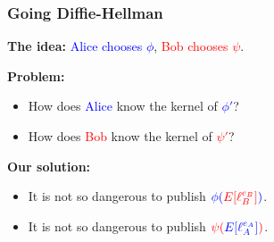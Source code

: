 \documentclass{beamer}
\newcommand{\bl}[1]{\textcolor{blue}{#1}}
\newcommand{\rd}[1]{\textcolor{red}{#1}}
\begin{document}

\begin{frame}
  \frametitle{Going Diffie-Hellman}

  \textbf{The idea:} \bl{Alice chooses $\phi$}, \rd{Bob chooses
    $\psi$}.
  
  \begin{center}
  \end{center}
  
  \textbf{Problem:}
  \begin{itemize}
  \item How does \bl{Alice} know the kernel of \bl{$\phi'$}?
  \item How does \rd{Bob} know the kernel of \rd{$\psi'$}?
  \end{itemize}

  \pause

  \textbf{Our solution:}
  \begin{itemize}
  \item It is not so dangerous to publish $\bl{\phi(}\rd{E[\ell_B^{e_B}]}\bl{)}$.
  \item It is not so dangerous to publish $\rd{\psi(}\bl{E[\ell_A^{e_A}]}\rd{)}$.
  \end{itemize}
\end{frame}

\end{document}
